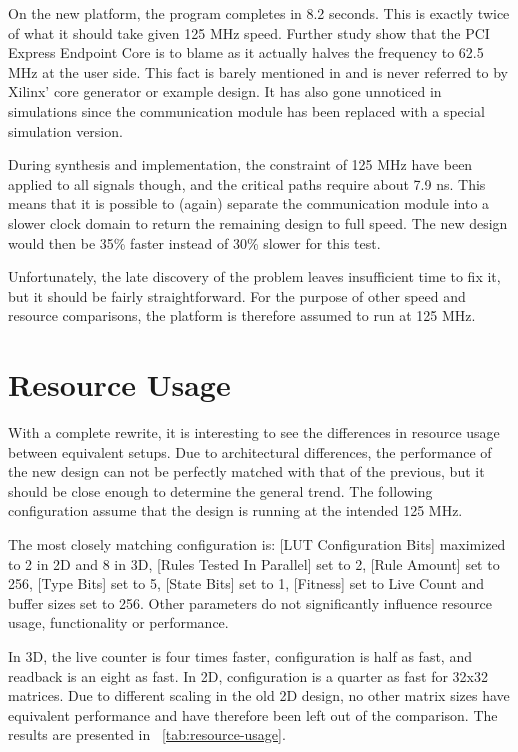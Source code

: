 On the new platform, the program completes in 8.2 seconds.
This is exactly twice of what it should take given 125 MHz speed.
Further study show that the PCI Express Endpoint Core is to blame as it actually halves the frequency to 62.5 MHz at the user side.
This fact is barely mentioned in \cite{ug672} and is never referred to by Xilinx' core generator or example design.
It has also gone unnoticed in simulations since the communication module has been replaced with a special simulation version.

During synthesis and implementation, the constraint of 125 MHz have been applied to all signals though, and the critical paths require about 7.9 ns.
This means that it is possible to (again) separate the communication module into a slower clock domain to return the remaining design to full speed.
The new design would then be 35\% faster instead of 30\% slower for this test.

Unfortunately, the late discovery of the problem leaves insufficient time to fix it, but it should be fairly straightforward.
For the purpose of other speed and resource comparisons, the platform is therefore assumed to run at 125 MHz.


\section{Resource Usage}

With a complete rewrite, it is interesting to see the differences in resource usage between equivalent setups.
Due to architectural differences, the performance of the new design can not be perfectly matched with that of the previous, but it should be close enough to determine the general trend.
The following configuration assume that the design is running at the intended 125 MHz.

The most closely matching configuration is:
[LUT Configuration Bits] maximized to 2 in 2D and 8 in 3D,
[Rules Tested In Parallel] set to 2,
[Rule Amount] set to 256,
[Type Bits] set to 5,
[State Bits] set to 1,
[Fitness] set to Live Count
and buffer sizes set to 256.
Other parameters do not significantly influence resource usage, functionality or performance.

In 3D, the live counter is four times faster, configuration is half as fast, and readback is an eight as fast.
In 2D, configuration is a quarter as fast for 32x32 matrices.
Due to different scaling in the old 2D design, no other matrix sizes have equivalent performance and have therefore been left out of the comparison.
The results are presented in \tablename~\ref{tab:resource-usage}.

